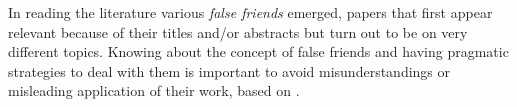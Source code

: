 
In reading the literature various \textit{false friends} emerged, papers that first appear relevant because of their titles and/or abstracts but turn out to be on very different topics. 
Knowing about the concept of false friends and having pragmatic strategies to deal with them is important to avoid misunderstandings or misleading application of their work, 
based on . 

